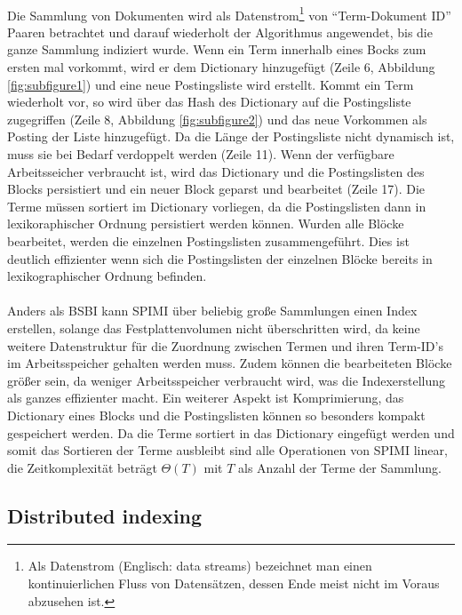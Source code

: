 \paragraph{}
 Die Sammlung von Dokumenten wird als Datenstrom\footnote{Als Datenstrom (Englisch: data streams) bezeichnet man einen kontinuierlichen Fluss von Datensätzen, dessen Ende meist nicht im Voraus abzusehen ist.} von \enquote{Term-Dokument ID} Paaren betrachtet und darauf wiederholt der Algorithmus angewendet, bis die ganze Sammlung indiziert wurde. Wenn ein Term innerhalb eines Bocks zum ersten mal vorkommt, wird er dem Dictionary hinzugefügt (Zeile 6, Abbildung \ref{fig:subfigure1}) und eine neue Postingsliste wird erstellt. Kommt ein Term wiederholt vor, so wird über das Hash des Dictionary auf die Postingsliste zugegriffen (Zeile 8, Abbildung \ref{fig:subfigure2}) und das neue Vorkommen als Posting der Liste hinzugefügt. Da die Länge der Postingsliste nicht dynamisch ist, muss sie bei Bedarf verdoppelt werden (Zeile 11). Wenn der verfügbare Arbeitsseicher verbraucht ist, wird das Dictionary und die Postingslisten des Blocks persistiert und ein neuer Block geparst und bearbeitet (Zeile 17). Die Terme müssen sortiert im Dictionary vorliegen, da die Postingslisten dann in lexikoraphischer Ordnung persistiert werden können. Wurden alle Blöcke bearbeitet, werden die einzelnen Postingslisten zusammengeführt. Dies ist deutlich effizienter wenn sich die Postingslisten der einzelnen Blöcke bereits in lexikographischer Ordnung befinden.\par

\paragraph{}
Anders als BSBI kann SPIMI über beliebig große Sammlungen einen Index erstellen, solange das Festplattenvolumen nicht überschritten wird, da keine weitere Datenstruktur für die Zuordnung zwischen Termen und ihren Term-ID's im Arbeitsspeicher gehalten werden muss. Zudem können die bearbeiteten Blöcke größer sein, da weniger Arbeitsspeicher verbraucht wird, was die Indexerstellung als ganzes effizienter macht. Ein weiterer Aspekt ist Komprimierung, das Dictionary eines Blocks und die Postingslisten können so besonders kompakt gespeichert werden. Da die Terme sortiert in das Dictionary eingefügt werden und somit das Sortieren der Terme ausbleibt sind alle Operationen von SPIMI linear, die Zeitkomplexität beträgt $\Theta(T)$ mit $T$ als Anzahl der Terme der Sammlung.

\subsection{Distributed indexing}
